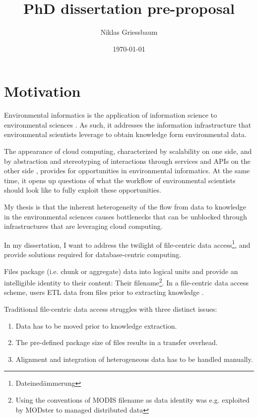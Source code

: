 \documentclass[a4paper,10pt]{article}
\title{PhD dissertation pre-proposal}
\author{Niklas Griessbaum}
\date{\today}
\begin{document}
\maketitle
\printglossaries

\newpage

\section{Motivation}

Environmental informatics is the application of information science to environmental sciences \citep{Frew2012}.
As such, it addresses the information infrastructure that environmental scientists leverage
to obtain knowledge form environmental data.

The appearance of cloud computing, characterized by scalability on one side, 
and by abstraction and stereotyping of interactions through services and \glspl{API} on the other side \citep{Foster2017}, 
provides for opportunities in environmental informatics. 
At the same time, it opens up questions of what the workflow
of environmental scientists should look like to fully exploit these opportunities.

My thesis is that the inherent heterogeneity of the flow from data to knowledge
in the environmental sciences causes bottlenecks that can be unblocked through 
infrastructures that are leveraging cloud computing.

In my dissertation, I want to address the twilight of file-centric data access\footnote{Dateinedämmerung}, and provide solutions required for database-centric computing.

Files package (i.e. chunk or aggregate) data into logical units and provide an intelligible identity to their content: Their filename\footnote{Using the conventions of MODIS  filename as data identity was e.g. exploited by MODster \citep{Frew2005, Frew2002} to managed distributed data}.
In a file-centric data access scheme, users \gls{ETL} data from files prior to extracting knowledge \citep{Rilee2016, Szalay2009}.

Traditional file-centric data access struggles with three distinct issues:
\begin{enumerate}
 \item Data has to be moved prior to knowledge extraction.
 \item The pre-defined package size of files results in a transfer overhead.
 \item Alignment and integration of heterogeneous data has to be handled manually.
\end{enumerate}
\end{document}
